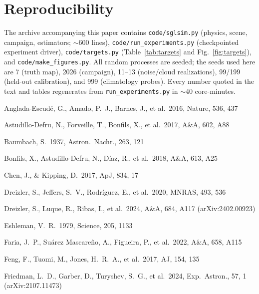 ﻿\documentclass[twocolumn]{emulateapj}
\begin{document}
\section{Reproducibility}
\label{app:repro}
The archive accompanying this paper contains \texttt{code/sglsim.py}
(physics, scene, campaign, estimators; $\sim$600 lines),
\texttt{code/run\_experiments.py} (checkpointed experiment driver),
\texttt{code/targets.py} (Table~\ref{tab:targets} and
Fig.~\ref{fig:targets}), and \texttt{code/make\_figures.py}. All random
processes are seeded; the seeds used here are 7 (truth map), 2026
(campaign), 11--13 (noise/cloud realizations), 99/199 (held-out
calibration), and 999 (climatology probes). Every number quoted in the
text and tables regenerates from
\texttt{run\_experiments.py} in $\sim$40 core-minutes.

\begin{thebibliography}{}

Anglada-Escud\'e, G., Amado, P.~J., Barnes, J., et al.\ 2016, Nature,
536, 437

Astudillo-Defru, N., Forveille, T., Bonfils, X., et al.\ 2017, A\&A,
602, A88

Baumbach, S.\ 1937, Astron.\ Nachr., 263, 121

Bonfils, X., Astudillo-Defru, N., D\'iaz, R., et al.\ 2018, A\&A, 613,
A25

Chen, J., \& Kipping, D.\ 2017, ApJ, 834, 17

Dreizler, S., Jeffers, S.~V., Rodr\'iguez, E., et al.\ 2020, MNRAS,
493, 536

Dreizler, S., Luque, R., Ribas, I., et al.\ 2024, A\&A, 684, A117
(arXiv:2402.00923)

Eshleman, V.~R.\ 1979, Science, 205, 1133

Faria, J.~P., Su\'arez Mascare\~no, A., Figueira, P., et al.\ 2022,
A\&A, 658, A115

Feng, F., Tuomi, M., Jones, H.~R.~A., et al.\ 2017, AJ, 154, 135

Friedman, L.~D., Garber, D., Turyshev, S.~G., et al.\ 2024, Exp.\
Astron., 57, 1 (arXiv:2107.11473)


\end{thebibliography}
\end{document}
